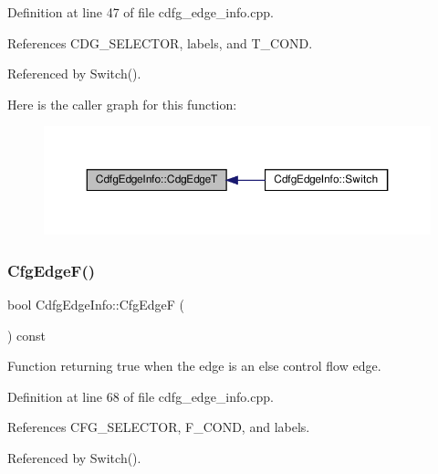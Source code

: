 Definition at line 47 of file cdfg\+\_\+edge\+\_\+info.\+cpp.



References C\+D\+G\+\_\+\+S\+E\+L\+E\+C\+T\+OR, labels, and T\+\_\+\+C\+O\+ND.



Referenced by Switch().

Here is the caller graph for this function\+:
\nopagebreak
\begin{figure}[H]
\begin{center}
\leavevmode
\includegraphics[width=350pt]{d0/d89/structCdfgEdgeInfo_add12d0e8da8fb0f05ccfbb8fc54e4ef2_icgraph}
\end{center}
\end{figure}
\mbox{\label{structCdfgEdgeInfo_a28dff795df29d3612a5622a4acdf3136}} 
\subsubsection{\texorpdfstring{Cfg\+Edge\+F()}{CfgEdgeF()}}
{\footnotesize\ttfamily bool Cdfg\+Edge\+Info\+::\+Cfg\+EdgeF (\begin{DoxyParamCaption}{ }\end{DoxyParamCaption}) const}



Function returning true when the edge is an else control flow edge. 



Definition at line 68 of file cdfg\+\_\+edge\+\_\+info.\+cpp.



References C\+F\+G\+\_\+\+S\+E\+L\+E\+C\+T\+OR, F\+\_\+\+C\+O\+ND, and labels.



Referenced by Switch().

